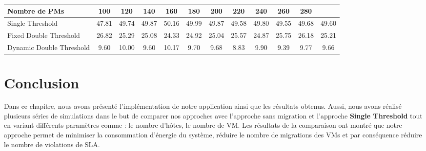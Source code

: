 \begin{onehalfspace}
\begin{center}
{\scriptsize   \begin{tabular}{|p{2.5cm}|c|c|c|c|c|c|c|c|c|c|c|}
\hline
      \centering     Nombre de PMs &  100& 120& 140& 160& 180& 200& 220& 240& 260& 280& \\
\hline
      \centering      Single Threshold &  47.81& 49.74& 49.87& 50.16& 49.99& 49.87& 49.58& 49.80& 49.55& 49.68& 49.60\\
\hline
      \centering      Fixed Double Threshold &  26.82& 25.29& 25.08& 24.33& 24.92& 25.04& 25.57& 24.87& 25.75& 26.18& 25.21\\
\hline
      \centering     Dynamic Double Threshold &  9.60& 10.00& 9.60& 10.17& 9.70& 9.68& 8.83& 9.90& 9.39& 9.77& 9.66\\
\hline
\end{tabular}}
\label{PVSLA2}
\end{center}

\end{onehalfspace}

\section{Conclusion}

\begin{onehalfspace}


Dans ce chapitre, nous avons présenté l’implémentation de notre application ainsi que les résultats obtenus. Aussi, nous avons réalisé plusieurs séries de simulations dans le but de comparer nos approches avec l’approche sans migration et l’approche  \textbf{Single Threshold}   tout en variant différents paramètres comme : le nombre d'hôtes, le nombre de VM. Les résultats de la comparaison ont montré que notre approche permet de minimiser  la consommation d’énergie du système, réduire le nombre de migrations des VMs et par conséquence réduire  le nombre de violations de SLA.

\end{onehalfspace}